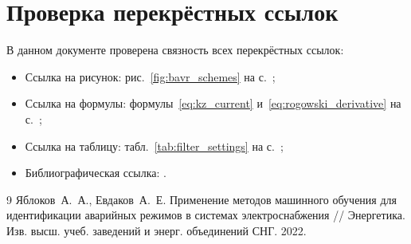 \documentclass[12pt,a4paper]{article}
\begin{document}
\section{Проверка перекрёстных ссылок}
В данном документе проверена связность всех перекрёстных ссылок:
\begin{itemize}
  \item Ссылка на рисунок: рис.~\ref{fig:bavr_schemes} на с.~\pageref{fig:bavr_schemes};
  \item Ссылка на формулы: формулы~\eqref{eq:kz_current} и~\eqref{eq:rogowski_derivative} на с.~\pageref{eq:kz_current};
  \item Ссылка на таблицу: табл.~\ref{tab:filter_settings} на с.~\pageref{tab:filter_settings};
  \item Библиографическая ссылка: \cite{yablokov2022}.
\end{itemize}

\begin{thebibliography}{9}
Яблоков~А.~А., Евдаков~А.~Е. Применение методов машинного обучения для идентификации аварийных режимов в системах электроснабжения // Энергетика. Изв. высш. учеб. заведений и энерг. объединений СНГ. 2022.
\end{thebibliography}
\end{document}
